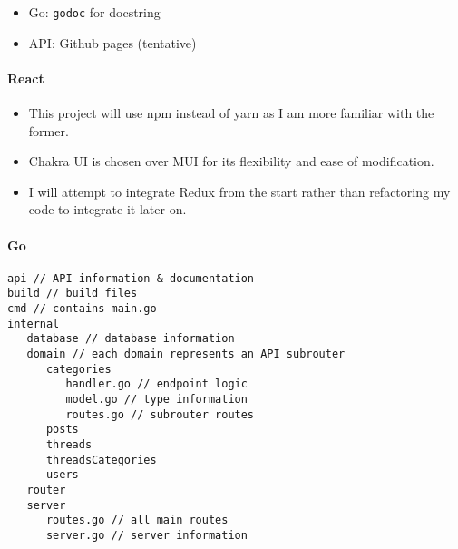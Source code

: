 \documentclass[10pt]{exam}
\providecommand{\tightlist}{%
  \setlength{\itemsep}{0pt}\setlength{\parskip}{0pt}}
\begin{document}
\begin{itemize}
\tightlist
\item
  Go: \texttt{godoc} for docstring
\item
  API: Github pages (tentative)
\end{itemize}

\hypertarget{react}{%
\paragraph{React}\label{react}}

\begin{itemize}
\tightlist
\item
  This project will use npm instead of yarn as I am more familiar with
  the former.
\item
  Chakra UI is chosen over MUI for its flexibility and ease of
  modification.
\item
  I will attempt to integrate Redux from the start rather than
  refactoring my code to integrate it later on.
\end{itemize}

\hypertarget{go}{%
\paragraph{Go}\label{go}}

\begin{verbatim}
api // API information & documentation
build // build files
cmd // contains main.go
internal 
   database // database information
   domain // each domain represents an API subrouter
      categories
         handler.go // endpoint logic
         model.go // type information
         routes.go // subrouter routes
      posts
      threads
      threadsCategories
      users
   router
   server
      routes.go // all main routes
      server.go // server information
\end{verbatim}
\end{document}
